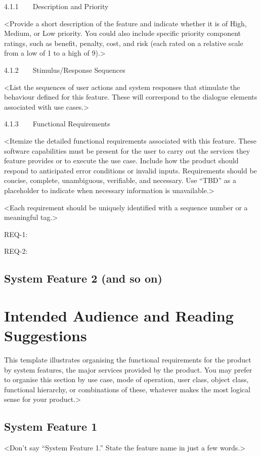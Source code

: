 \documentclass{scrreprt}
\begin{document}
4.1.1    Description and Priority

<Provide a short description of the feature and indicate whether it is of High, Medium, or Low priority. You could also include specific priority component ratings, such as benefit, penalty, cost, and risk (each rated on a relative scale from a low of 1 to a high of 9).>

4.1.2    Stimulus/Response Sequences

<List the sequences of user actions and system responses that stimulate the behaviour defined for this feature. These will correspond to the dialogue elements associated with use cases.>

4.1.3    Functional Requirements

<Itemize the detailed functional requirements associated with this feature. These software capabilities must be present for the user to carry out the services they feature provides or to execute the use case. Include how the product should respond to anticipated error conditions or invalid inputs. Requirements should be concise, complete, unambiguous, verifiable, and necessary. Use “TBD” as a placeholder to indicate when necessary information is unavailable.>

<Each requirement should be uniquely identified with a sequence number or a meaningful tag.>

REQ-1:

REQ-2:

\subsection*{System Feature 2 (and so on)}
    \section{Intended Audience and Reading Suggestions}
    This template illustrates organising the functional requirements for the product by system features, the major services provided by the product. You may prefer to organise this section by use case, mode of operation, user class, object class, functional hierarchy, or combinations of these, whatever makes the most logical sense for your product.>

\subsection*{System Feature 1}

<Don’t say “System Feature 1.” State the feature name in just a few words.>
\end{document}
